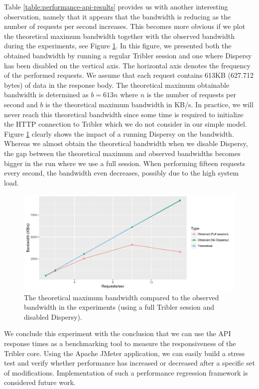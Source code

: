 Table \ref{table:performance-api-results} provides us with another interesting observation, namely that it appears that the bandwidth is reducing as the number of requests per second increases. This becomes more obvious if we plot the theoretical maximum bandwidth together with the observed bandwidth during the experiments, see Figure \ref{fig:api-bandwidth-performance}. In this figure, we presented both the obtained bandwidth by running a regular Tribler session and one where Dispersy has been disabled on the vertical axis. The horizontal axis denotes the frequency of the performed requests. We assume that each request contains 613KB (627.712 bytes) of data in the response body. The theoretical maximum obtainable bandwidth is determined as $ b = 613n $ where $ n $ is the number of requests per second and $ b $ is the theoretical maximum bandwidth in KB/s. In practice, we will never reach this theoretical bandwidth since some time is required to initialize the HTTP connection to Tribler which we do not consider in our simple model. Figure \ref{fig:api-bandwidth-performance} clearly shows the impact of a running Dispersy on the bandwidth. Whereas we almost obtain the theoretical bandwidth when we disable Dispersy, the gap between the theoretical maximum and observed bandwidths becomes bigger in the run where we use a full session. When performing fifteen requests every second, the bandwidth even decreases, possibly due to the high system load.\\

\begin{figure}[h!]
	\centering
	\includegraphics[width=1.0\columnwidth]{images/experiments/api_bandwidth_performance}
	\caption{The theoretical maximum bandwidth compared to the observed bandwidth in the experiments (using a full Tribler session and disabled Dispersy).}
	\label{fig:api-bandwidth-performance}
\end{figure}

We conclude this experiment with the conclusion that we can use the API response times as a benchmarking tool to measure the responsiveness of the Tribler core. Using the Apache JMeter application, we can easily build a stress test and verify whether performance has increased or decreased after a specific set of modifications. Implementation of such a performance regression framework is considered future work. 

